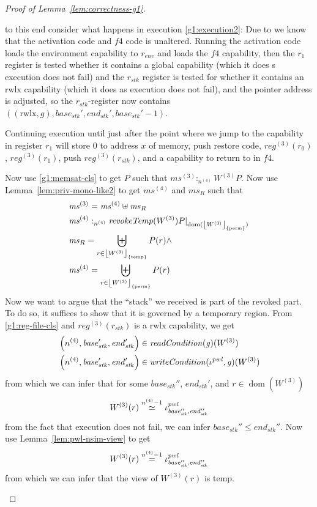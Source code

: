\documentclass[a4paper]{article}
\DeclarePairedDelimiter\floor{\lfloor}{\rfloor}
\newcommand{\nequal}[1][n]{\stackrel{\tiny{#1}}{=}}
\renewcommand{\nsim}[1][n]{\stackrel{\tiny{#1}}{\simeq}}
\DeclareMathOperator{\dom}{dom}
\newcommand{\var}[1]{\mathit{#1}}
\newcommand{\hs}{\var{ms}}
\newcommand{\ms}{\hs}
\newcommand{\gl}{\var{g}}
\newcommand{\start}{\var{base}}
\newcommand{\addrend}{\var{end}}
\newcommand{\reg}{\var{reg}}
\newcommand{\heap}{\var{mem}}
\newcommand{\stk}{\var{stk}}
\newcommand{\pwl}{\var{pwl}}
\newcommand{\plainfun}[2]{
  \ifthenelse{\equal{#2}{}}
  {\mathit{#1}}
  {\mathit{#1}(#2)}
}
\newcommand{\readCond}[1]{\plainfun{readCondition}{#1}}
\newcommand{\writeCond}[1]{\plainfun{writeCondition}{#1}}
\newcommand{\revokeTemp}[1]{\plainfun{revokeTemp}{#1}}
\newcommand{\erase}[2]{\floor*{#1}_{\{#2\}}}
\newcommand{\heapSat}[3][\heap]{#1 :_{#2} #3}
\newcommand{\memSat}[3][n]{\heapSat[#2]{#1}{#3}}
\newcommand{\npair}[2][n]{\left(#1,#2 \right)}
\newcommand{\plainperm}[1]{\mathrm{#1}}
\newcommand{\rwlx}{\plainperm{rwlx}}
\newcommand{\plainview}[1]{\mathrm{#1}}
\newcommand{\perma}{\plainview{perm}}
\newcommand{\temp}{\plainview{temp}}
\begin{document}
\begin{lemma}
\begin{proof}[Proof of Lemma~\ref{lem:correctness-g1}]
\begin{enumproof}
\begin{enumproof}
\begin{enumproof}
\begin{enumproof}
\begin{equation}
          \end{equation}
          to this end consider what happens in execution \ref{g1:execution2}: Due to \label{g1:memsat-cls} we know that the activation code and $f4$ code is unaltered. Running the activation code loads the environment capability to $r_{\var{env}}$ and loads the $f4$ capability, then the $r_1$ register is tested whether it contains a global capability (which it does s execution does not fail) and the $r_\stk$ register is tested for whether it contains an $\rwlx$ capability (which it does as execution does not fail), and the pointer address is adjusted, so the $r_\stk$-register now contains $((\rwlx, \gl), \start_{\stk}', \addrend_{\stk}', \start_{\stk}'-1)$.

          Continuing execution until just after the point where we jump to the capability in register $r_1$ will store $0$ to address $x$ of memory, push restore code, $\reg^{(3)}(r_0)$, $\reg^{(3)}(r_1)$, push $\reg^{(3)}(r_\stk)$, and a capability to return to in $f4$.

          Now use \ref{g1:memsat-cls} to get $P$ such that $\memSat[n^{(4)}]{\ms^{(3)}}{W^{(3)}}{P}$. Now use Lemma~\ref{lem:priv-mono-like2} to get $\ms^{(4)}$ and $\ms_R$ such that
          \begin{align*}
            & \ms^{(3)} = \ms^{(4)} \uplus \ms_R \\
            & \memSat[n^{(4)}]{\ms^{(4)}}{\revokeTemp{W^{(3)}}}{P|_{\dom(\erase{W^{(3)}}{\perma})}} \\
            & \ms_R = \biguplus_{r \in \erase{W^{(3)}}{\temp}} P(r) \land \\
            & \ms^{(4)} = \biguplus_{r \in \erase{W^{(3)}}{\perma}} P(r)
          \end{align*}
          Now we want to argue that the ``stack'' we received is part of the revoked part. To do so, it suffices to show that it is governed by a temporary region. From \ref{g1:reg-file-cls} and $\reg^{(3)}(r_\stk)$ is a $\rwlx$ capability, we get
          \begin{align*}
            &\npair[n^{(4)}]{\start_\stk',\addrend_\stk'} \in \readCond{}(\gl)(W^{(3)}) \\
            &\npair[n^{(4)}]{\start_\stk',\addrend_\stk'} \in \writeCond{}(\iota^\pwl,\gl)(W^{(3)})
          \end{align*}
          from which we can infer that for some $\start_\stk''$, $\addrend_\stk'$, and $r\in\dom(W^{(3)})$
          \[
            W^{(3)}(r) \nsim[n^{(4)}-1] \iota^\pwl_{\start_\stk'',\addrend_\stk''}
          \]
          from the fact that execution does not fail, we can infer $\start_\stk'' \leq \addrend_\stk''$. Now use Lemma~\ref{lem:pwl-nsim-view} to get
          \[
            W^{(3)}(r) \nequal[n^{(4)}-1] \iota^\pwl_{\start_\stk'',\addrend_\stk''}
          \]
          from which we can infer that the view of $W^{(3)}(r)$ is $\temp$.


\end{enumproof}
\end{enumproof}
\end{enumproof}
\end{enumproof}
\end{proof}
\end{lemma}
\end{document}

